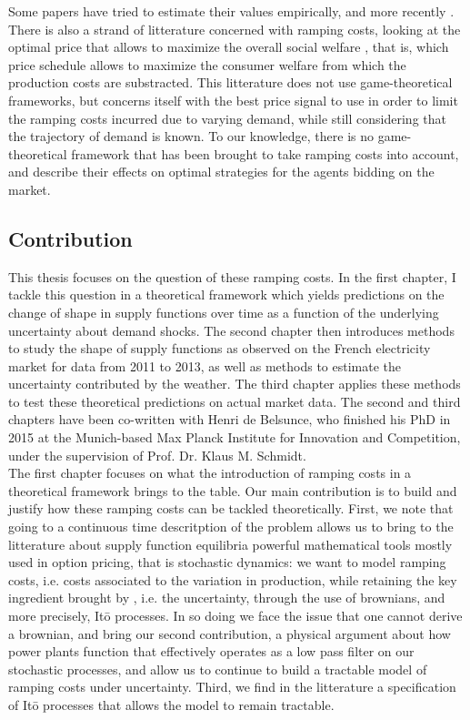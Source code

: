 Some papers have tried to estimate their values empirically, \cite{wolak2007quantifying} and more recently \cite{reguant2011welfare}. There is also a strand of litterature concerned with ramping costs, looking at the optimal price that allows to maximize the overall social welfare \cite{tanaka2006real}, that is, which price schedule allows to maximize the consumer welfare from which the production costs are substracted. This litterature does not use game-theoretical frameworks, but concerns itself with the best price signal to use in order to limit the ramping costs incurred due to varying demand, while still considering that the trajectory of demand is known. To our knowledge, there is no game-theoretical framework that has been brought to take ramping costs into account, and describe their effects on optimal strategies for the agents bidding on the market. 

\subsection*{Contribution}

This thesis focuses on the question of these ramping costs. In the first chapter, I tackle this question in a theoretical framework which yields predictions on the change of shape in supply functions over time as a function of the underlying uncertainty about demand shocks. The second chapter then introduces methods to study the shape of supply functions as observed on the French electricity market for data from 2011 to 2013, as well as methods to estimate the uncertainty contributed by the weather. The third chapter applies these methods to test these theoretical predictions on actual market data. The second and third chapters have been co-written with Henri de Belsunce, who finished his PhD in 2015 at the Munich-based Max Planck Institute for Innovation and Competition, under the supervision of Prof. Dr. Klaus M. Schmidt.\\

The first chapter focuses on what the introduction of ramping costs in a theoretical framework brings to the table. Our main contribution is to build and justify how these ramping costs can be tackled theoretically. First, we note that going to a continuous time descritption of the problem allows us to bring to the litterature about supply function equilibria powerful mathematical tools mostly used in option pricing, that is stochastic dynamics: we want to model ramping costs, i.e. costs associated to the variation in production, while retaining the key ingredient brought by \cite{KM}, i.e. the uncertainty, through the use of brownians, and more precisely, It\={o} processes. In so doing we face the issue that one cannot derive a brownian, and bring our second contribution, a physical argument about how power plants function that effectively operates as a low pass filter on our stochastic processes, and allow us to continue to build a tractable model of ramping costs under uncertainty. Third, we find in the litterature a specification of It\={o} processes that allows the model to remain tractable. \\

